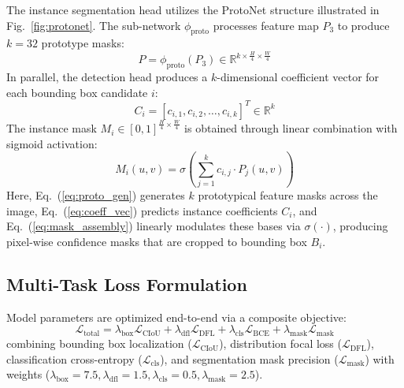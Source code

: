 \documentclass[conference]{IEEEtran}
\begin{document}
The instance segmentation head utilizes the ProtoNet structure illustrated in Fig.~\ref{fig:protonet}. The sub-network $\phi_{\text{proto}}$ processes feature map $P_3$ to produce $k = 32$ prototype masks:
\begin{equation}
P = \phi_{\text{proto}}(P_3) \in \mathbb{R}^{k \times \frac{H}{4} \times \frac{W}{4}}
\label{eq:proto_gen}
\end{equation}
In parallel, the detection head produces a $k$-dimensional coefficient vector for each bounding box candidate $i$:
\begin{equation}
C_i = [c_{i,1}, c_{i,2}, \dots, c_{i,k}]^T \in \mathbb{R}^k
\label{eq:coeff_vec}
\end{equation}
The instance mask $M_i \in [0, 1]^{\frac{H}{4} \times \frac{W}{4}}$ is obtained through linear combination with sigmoid activation:
\begin{equation}
M_i(u, v) = \sigma \left( \sum_{j=1}^k c_{i,j} \cdot P_j(u, v) \right)
\label{eq:mask_assembly}
\end{equation}
Here, Eq.~(\ref{eq:proto_gen}) generates $k$ prototypical feature masks across the image, Eq.~(\ref{eq:coeff_vec}) predicts instance coefficients $C_i$, and Eq.~(\ref{eq:mask_assembly}) linearly modulates these bases via $\sigma(\cdot)$, producing pixel-wise confidence masks that are cropped to bounding box $B_i$.

\subsection{Multi-Task Loss Formulation}
Model parameters are optimized end-to-end via a composite objective:
\begin{equation}
\mathcal{L}_{\text{total}} = \lambda_{\text{box}}\mathcal{L}_{\text{CIoU}} + \lambda_{\text{dfl}}\mathcal{L}_{\text{DFL}} + \lambda_{\text{cls}}\mathcal{L}_{\text{BCE}} + \lambda_{\text{mask}}\mathcal{L}_{\text{mask}}
\label{eq:total_loss}
\end{equation}
combining bounding box localization ($\mathcal{L}_{\text{CIoU}}$), distribution focal loss ($\mathcal{L}_{\text{DFL}}$), classification cross-entropy ($\mathcal{L}_{\text{cls}}$), and segmentation mask precision ($\mathcal{L}_{\text{mask}}$) with weights ($\lambda_{\text{box}} = 7.5, \lambda_{\text{dfl}} = 1.5, \lambda_{\text{cls}} = 0.5, \lambda_{\text{mask}} = 2.5$).
\end{document}
